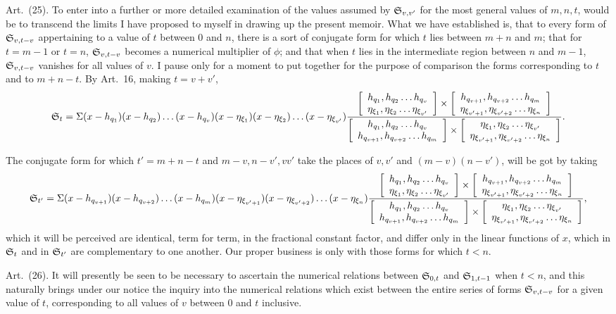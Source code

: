 \documentclass[11pt]{article}
\newcommand{\sourcepage}[1]{\marginpar{\scriptsize p.~#1}}
\newcommand{\art}[1]{\par\smallskip\noindent Art.~(#1).\quad}
\begin{document}
\art{25} To enter into a further or more detailed examination of the values assumed by $\mathfrak{S}_{v,v'}$ for the most general values of $m,n,t$, would be to transcend the limits I have proposed to myself in drawing up the present memoir. What we have established is, that to every form of $\mathfrak{S}_{v,t-v}$ appertaining to a value of $t$ between 0 and $n$, there is a sort of conjugate form for which $t$ lies between $m+n$ and $m$; that for $t=m-1$ or $t=n$, $\mathfrak{S}_{v,t-v}$ becomes a numerical multiplier of $\phi$; and that when $t$ lies in the intermediate region between $n$ and $m-1$, $\mathfrak{S}_{v,t-v}$ vanishes for all values of $v$. I pause only for a moment to put together for the purpose of comparison the forms corresponding to $t$ and to $m+n-t$. By Art.~16, making $t=v+v'$,
\begingroup\scriptsize
\[
\mathfrak{S}_t=\Sigma(x-h_{q_1})(x-h_{q_2})\ldots(x-h_{q_v})(x-\eta_{\xi_1})(x-\eta_{\xi_2})\ldots(x-\eta_{\xi_{v'}})
\frac{\left[\begin{array}{c}h_{q_1},h_{q_2}\ldots h_{q_v}\\\eta_{\xi_1},\eta_{\xi_2}\ldots\eta_{\xi_{v'}}\end{array}\right]\times
\left[\begin{array}{c}h_{q_{v+1}},h_{q_{v+2}}\ldots h_{q_m}\\\eta_{\xi_{v'+1}},\eta_{\xi_{v'+2}}\ldots\eta_{\xi_n}\end{array}\right]}{
\left[\begin{array}{c}h_{q_1},h_{q_2}\ldots h_{q_v}\\h_{q_{v+1}},h_{q_{v+2}}\ldots h_{q_m}\end{array}\right]\times
\left[\begin{array}{c}\eta_{\xi_1},\eta_{\xi_2}\ldots\eta_{\xi_{v'}}\\\eta_{\xi_{v'+1}},\eta_{\xi_{v'+2}}\ldots\eta_{\xi_n}\end{array}\right]}.
\]
\endgroup

\sourcepage{471}
The conjugate form for which $t'=m+n-t$ and $m-v,n-v',vv'$ take the places of $v,v'$ and $(m-v)(n-v')$, will be got by taking
\begingroup\scriptsize
\[
\mathfrak{S}_{t'}=\Sigma(x-h_{q_{v+1}})(x-h_{q_{v+2}})\ldots(x-h_{q_m})(x-\eta_{\xi_{v'+1}})(x-\eta_{\xi_{v'+2}})\ldots(x-\eta_{\xi_n})
\frac{\left[\begin{array}{c}h_{q_1},h_{q_2}\ldots h_{q_v}\\\eta_{\xi_1},\eta_{\xi_2}\ldots\eta_{\xi_{v'}}\end{array}\right]\times
\left[\begin{array}{c}h_{q_{v+1}},h_{q_{v+2}}\ldots h_{q_m}\\\eta_{\xi_{v'+1}},\eta_{\xi_{v'+2}}\ldots\eta_{\xi_n}\end{array}\right]}{
\left[\begin{array}{c}h_{q_1},h_{q_2}\ldots h_{q_v}\\h_{q_{v+1}},h_{q_{v+2}}\ldots h_{q_m}\end{array}\right]\times
\left[\begin{array}{c}\eta_{\xi_1},\eta_{\xi_2}\ldots\eta_{\xi_{v'}}\\\eta_{\xi_{v'+1}},\eta_{\xi_{v'+2}}\ldots\eta_{\xi_n}\end{array}\right]},
\]
\endgroup
which it will be perceived are identical, term for term, in the fractional constant factor, and differ only in the linear functions of $x$, which in $\mathfrak{S}_t$ and in $\mathfrak{S}_{t'}$ are complementary to one another. Our proper business is only with those forms for which $t<n$.

\art{26} It will presently be seen to be necessary to ascertain the numerical relations between $\mathfrak{S}_{0,t}$ and $\mathfrak{S}_{1,t-1}$ when $t<n$, and this naturally brings under our notice the inquiry into the numerical relations which exist between the entire series of forms $\mathfrak{S}_{v,t-v}$ for a given value of $t$, corresponding to all values of $v$ between 0 and $t$ inclusive.
\end{document}

